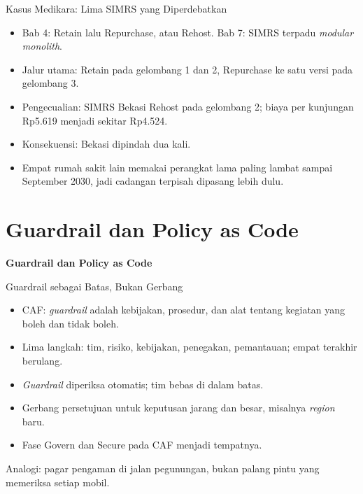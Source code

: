 \documentclass[aspectratio=169, table, 12pt]{beamer}
\begin{document}
\begin{frame}{{\Large Kasus Medikara: Lima SIMRS yang Diperdebatkan}}
  \vspace{10pt}
  \begin{itemize}
    \item Bab 4: Retain lalu Repurchase, atau Rehost. Bab 7: SIMRS terpadu \textit{modular monolith}.
    \item Jalur utama: Retain pada gelombang 1 dan 2, Repurchase ke satu versi pada gelombang 3.
    \item Pengecualian: SIMRS Bekasi Rehost pada gelombang 2; biaya per kunjungan Rp5.619 menjadi
          sekitar Rp4.524.
    \item Konsekuensi: Bekasi dipindah dua kali.
    \item Empat rumah sakit lain memakai perangkat lama paling lambat sampai September 2030, jadi
          cadangan terpisah dipasang lebih dulu.
  \end{itemize}
\end{frame}

\section{Guardrail dan Policy as Code}

\begin{frame}{\hfill}
  \centering
  \Huge{\textbf{Guardrail dan Policy as Code}}
\end{frame}

\begin{frame}{{\Large Guardrail sebagai Batas, Bukan Gerbang}}
  \vspace{10pt}
  \begin{itemize}
    \item CAF: \textit{guardrail} adalah kebijakan, prosedur, dan alat tentang kegiatan yang boleh
          dan tidak boleh.
    \item Lima langkah: tim, risiko, kebijakan, penegakan, pemantauan; empat terakhir berulang.
    \item \textit{Guardrail} diperiksa otomatis; tim bebas di dalam batas.
    \item Gerbang persetujuan untuk keputusan jarang dan besar, misalnya \textit{region} baru.
    \item Fase Govern dan Secure pada CAF menjadi tempatnya.
  \end{itemize}
  \vspace{6pt}
  {\small Analogi: pagar pengaman di jalan pegunungan, bukan palang pintu yang memeriksa setiap
  mobil.}
\end{frame}
\end{document}
